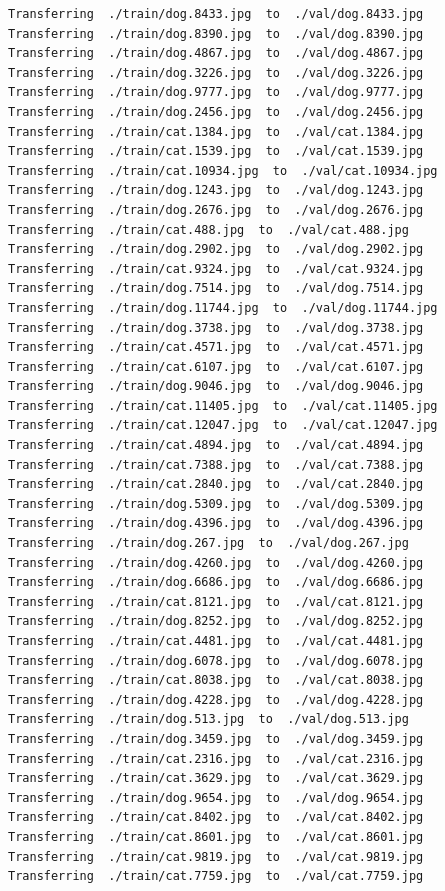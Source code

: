 \documentclass[]{book}
\theoremstyle{definition}
\theoremstyle{definition}
\theoremstyle{definition}
\theoremstyle{remark}
\begin{document}
\begin{verbatim}
Transferring  ./train/dog.8433.jpg  to  ./val/dog.8433.jpg
Transferring  ./train/dog.8390.jpg  to  ./val/dog.8390.jpg
Transferring  ./train/dog.4867.jpg  to  ./val/dog.4867.jpg
Transferring  ./train/dog.3226.jpg  to  ./val/dog.3226.jpg
Transferring  ./train/dog.9777.jpg  to  ./val/dog.9777.jpg
Transferring  ./train/dog.2456.jpg  to  ./val/dog.2456.jpg
Transferring  ./train/cat.1384.jpg  to  ./val/cat.1384.jpg
Transferring  ./train/cat.1539.jpg  to  ./val/cat.1539.jpg
Transferring  ./train/cat.10934.jpg  to  ./val/cat.10934.jpg
Transferring  ./train/dog.1243.jpg  to  ./val/dog.1243.jpg
Transferring  ./train/dog.2676.jpg  to  ./val/dog.2676.jpg
Transferring  ./train/cat.488.jpg  to  ./val/cat.488.jpg
Transferring  ./train/dog.2902.jpg  to  ./val/dog.2902.jpg
Transferring  ./train/cat.9324.jpg  to  ./val/cat.9324.jpg
Transferring  ./train/dog.7514.jpg  to  ./val/dog.7514.jpg
Transferring  ./train/dog.11744.jpg  to  ./val/dog.11744.jpg
Transferring  ./train/dog.3738.jpg  to  ./val/dog.3738.jpg
Transferring  ./train/cat.4571.jpg  to  ./val/cat.4571.jpg
Transferring  ./train/cat.6107.jpg  to  ./val/cat.6107.jpg
Transferring  ./train/dog.9046.jpg  to  ./val/dog.9046.jpg
Transferring  ./train/cat.11405.jpg  to  ./val/cat.11405.jpg
Transferring  ./train/cat.12047.jpg  to  ./val/cat.12047.jpg
Transferring  ./train/cat.4894.jpg  to  ./val/cat.4894.jpg
Transferring  ./train/cat.7388.jpg  to  ./val/cat.7388.jpg
Transferring  ./train/cat.2840.jpg  to  ./val/cat.2840.jpg
Transferring  ./train/dog.5309.jpg  to  ./val/dog.5309.jpg
Transferring  ./train/dog.4396.jpg  to  ./val/dog.4396.jpg
Transferring  ./train/dog.267.jpg  to  ./val/dog.267.jpg
Transferring  ./train/dog.4260.jpg  to  ./val/dog.4260.jpg
Transferring  ./train/dog.6686.jpg  to  ./val/dog.6686.jpg
Transferring  ./train/cat.8121.jpg  to  ./val/cat.8121.jpg
Transferring  ./train/dog.8252.jpg  to  ./val/dog.8252.jpg
Transferring  ./train/cat.4481.jpg  to  ./val/cat.4481.jpg
Transferring  ./train/dog.6078.jpg  to  ./val/dog.6078.jpg
Transferring  ./train/cat.8038.jpg  to  ./val/cat.8038.jpg
Transferring  ./train/dog.4228.jpg  to  ./val/dog.4228.jpg
Transferring  ./train/dog.513.jpg  to  ./val/dog.513.jpg
Transferring  ./train/dog.3459.jpg  to  ./val/dog.3459.jpg
Transferring  ./train/cat.2316.jpg  to  ./val/cat.2316.jpg
Transferring  ./train/cat.3629.jpg  to  ./val/cat.3629.jpg
Transferring  ./train/dog.9654.jpg  to  ./val/dog.9654.jpg
Transferring  ./train/cat.8402.jpg  to  ./val/cat.8402.jpg
Transferring  ./train/cat.8601.jpg  to  ./val/cat.8601.jpg
Transferring  ./train/cat.9819.jpg  to  ./val/cat.9819.jpg
Transferring  ./train/cat.7759.jpg  to  ./val/cat.7759.jpg

\end{verbatim}
\end{document}
